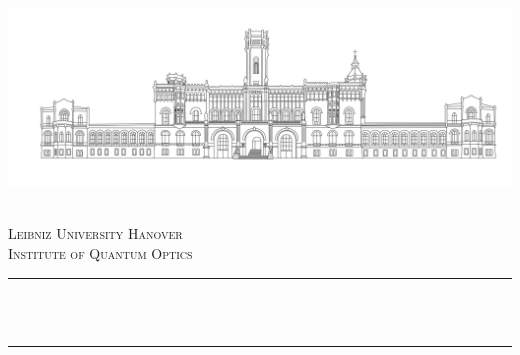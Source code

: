 \begin{titlepage}

\newcommand{\HRule}{\rule{\linewidth}{0.5mm}} %

\begin{center}
   \includegraphics[width=\linewidth]{../GRAPHICS/luh.png}\\[1cm] %
\end{center}
 

\center %

\makeatletter
\textsc{\LARGE \@subject}\\[1.5cm] %
\makeatother
\textsc{\Large Leibniz University Hanover}\\[0.5cm] %
\textsc{\large Institute of Quantum Optics}\\[0.5cm] %

\makeatletter
\HRule \\[0.7cm]
{ \LARGE \bfseries \@title}\\[0.4cm] %
\HRule \\[1.5cm]
 


\end{titlepage}

